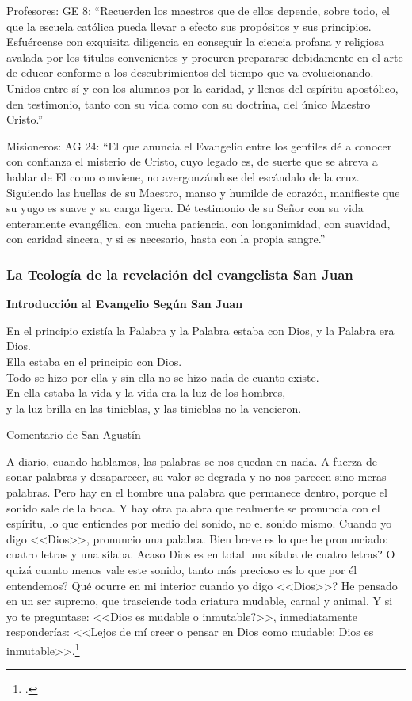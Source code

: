 \documentclass[12pt]{article}
\begin{document}
Profesores:
GE 8:
``Recuerden los maestros que de ellos depende, sobre todo, el que la escuela católica pueda llevar a efecto sus propósitos y sus principios. Esfuércense con exquisita diligencia en conseguir la ciencia profana y religiosa avalada por los títulos convenientes y procuren prepararse debidamente en el arte de educar conforme a los descubrimientos del tiempo que va evolucionando. Unidos entre sí y con los alumnos por la caridad, y llenos del espíritu apostólico, den testimonio, tanto con su vida como con su doctrina, del único Maestro Cristo.''

Misioneros:
AG 24:
``El que anuncia el Evangelio entre los gentiles dé a conocer con confianza el misterio de Cristo, cuyo legado es, de suerte que se atreva a hablar de El como conviene, no avergonzándose del escándalo de la cruz. Siguiendo las huellas de su Maestro, manso y humilde de corazón, manifieste que su yugo es suave y su carga ligera. Dé testimonio de su Señor con su vida enteramente evangélica, con mucha paciencia, con longanimidad, con suavidad, con caridad sincera, y si es necesario, hasta con la propia sangre.''

\subsubsection{La Teología de la revelación del evangelista San Juan}


\noindent \textbf{Introducción al Evangelio Según San Juan}

\noindent
\textrm{
 En el principio existía la Palabra y la Palabra estaba con Dios, y la Palabra era Dios.\\
 Ella estaba en el principio con Dios.\\
 Todo se hizo por ella y sin ella no se hizo nada de cuanto existe.\\
 En ella estaba la vida y la vida era la luz de los hombres,\\
 y la luz brilla en las tinieblas, y las tinieblas no la vencieron.\\
}

\noindent Comentario de San Agustín

\noindent
A diario, cuando hablamos, las palabras se nos quedan en nada. A fuerza de sonar palabras y desaparecer, su valor se degrada y no nos parecen sino meras palabras. Pero hay en el hombre una palabra que permanece dentro, porque el sonido sale de la boca. Y hay otra palabra que realmente se pronuncia con el espíritu, lo que entiendes por medio del sonido, no el sonido mismo. Cuando yo digo <<Dios>>, pronuncio una palabra. Bien breve es lo que he pronunciado: cuatro letras y una sílaba. \textquestiondown Acaso Dios es en total una sílaba de cuatro letras? \textquestiondown O quizá cuanto menos vale este sonido, tanto más precioso es lo que por él entendemos? \textquestiondown Qué ocurre en mi interior cuando yo digo <<Dios>>? He pensado en un ser supremo, que trasciende toda criatura mudable, carnal y animal. Y si yo te preguntase: <<\textquestiondown Dios es mudable o inmutable?>>, inmediatamente responderías: <<Lejos de mí creer o pensar en Dios como mudable: Dios es inmutable>>.\footcite[n.~8]{aguscomentjn} 
\end{document}
